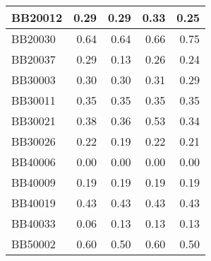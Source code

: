 \begin{table}[!htbp]
\begin{tabular}{|l|r|r|r|r|}
		\hline
		BB20012 & \cellcolor[rgb]{ .686,  .871,  .733}0.29 & \cellcolor[rgb]{ .686,  .871,  .733}0.29 & \cellcolor[rgb]{ .988,  1,  .992}0.33 & \cellcolor[rgb]{ .384,  .745,  .478}0.25 \\
		\hline
		BB20030 & \cellcolor[rgb]{ .384,  .745,  .478}0.64 & \cellcolor[rgb]{ .384,  .745,  .478}0.64 & \cellcolor[rgb]{ .502,  .792,  .58}0.66 & \cellcolor[rgb]{ .988,  1,  .992}0.75 \\
		\hline
		BB20037 & \cellcolor[rgb]{ .988,  1,  .992}0.29 & \cellcolor[rgb]{ .384,  .745,  .478}0.13 & \cellcolor[rgb]{ .867,  .949,  .886}0.26 & \cellcolor[rgb]{ .804,  .922,  .835}0.24 \\
		\hline
		BB30003 & \cellcolor[rgb]{ .682,  .871,  .733}0.30 & \cellcolor[rgb]{ .682,  .871,  .733}0.30 & \cellcolor[rgb]{ .988,  1,  .992}0.31 & \cellcolor[rgb]{ .384,  .745,  .478}0.29 \\
		\hline
		BB30011 & \cellcolor[rgb]{ .988,  1,  .992}0.35 & \cellcolor[rgb]{ .988,  1,  .992}0.35 & \cellcolor[rgb]{ .988,  1,  .992}0.35 & \cellcolor[rgb]{ .988,  1,  .992}0.35 \\
		\hline
		BB30021 & \cellcolor[rgb]{ .522,  .804,  .596}0.38 & \cellcolor[rgb]{ .451,  .773,  .537}0.36 & \cellcolor[rgb]{ .988,  1,  .992}0.53 & \cellcolor[rgb]{ .384,  .745,  .478}0.34 \\
		\hline
		BB30026 & \cellcolor[rgb]{ .988,  1,  .992}0.22 & \cellcolor[rgb]{ .384,  .745,  .478}0.19 & \cellcolor[rgb]{ .988,  1,  .992}0.22 & \cellcolor[rgb]{ .682,  .871,  .733}0.21 \\
		\hline
		BB40006 & \cellcolor[rgb]{ .988,  1,  .992}0.00 & \cellcolor[rgb]{ .988,  1,  .992}0.00 & \cellcolor[rgb]{ .988,  1,  .992}0.00 & \cellcolor[rgb]{ .988,  1,  .992}0.00 \\
		\hline
		BB40009 & \cellcolor[rgb]{ .988,  1,  .992}0.19 & \cellcolor[rgb]{ .988,  1,  .992}0.19 & \cellcolor[rgb]{ .988,  1,  .992}0.19 & \cellcolor[rgb]{ .988,  1,  .992}0.19 \\
		\hline
		BB40019 & \cellcolor[rgb]{ .988,  1,  .992}0.43 & \cellcolor[rgb]{ .988,  1,  .992}0.43 & \cellcolor[rgb]{ .988,  1,  .992}0.43 & \cellcolor[rgb]{ .988,  1,  .992}0.43 \\
		\hline
		BB40033 & \cellcolor[rgb]{ .384,  .745,  .478}0.06 & \cellcolor[rgb]{ .988,  1,  .992}0.13 & \cellcolor[rgb]{ .988,  1,  .992}0.13 & \cellcolor[rgb]{ .988,  1,  .992}0.13 \\
		\hline
		BB50002 & \cellcolor[rgb]{ .988,  1,  .992}0.60 & \cellcolor[rgb]{ .384,  .745,  .478}0.50 & \cellcolor[rgb]{ .988,  1,  .992}0.60 & \cellcolor[rgb]{ .384,  .745,  .478}0.50 \\

\end{tabular}
\end{table}
